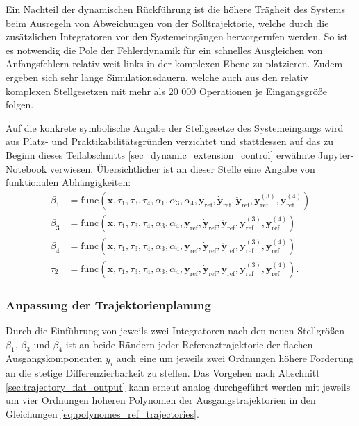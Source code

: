 Ein Nachteil der dynamischen Rückführung ist die höhere Trägheit des Systems beim Ausregeln von Abweichungen von der Solltrajektorie, welche durch die zusätzlichen Integratoren vor den Systemeingängen hervorgerufen werden. So ist es notwendig die Pole der Fehlerdynamik für ein schnelles Ausgleichen von Anfangsfehlern relativ weit links in der komplexen Ebene zu platzieren. Zudem ergeben sich sehr lange Simulationsdauern, welche auch aus den relativ komplexen Stellgesetzen mit mehr als 20 000 Operationen je Eingangsgröße folgen. 

Auf die konkrete symbolische Angabe der Stellgesetze des Systemeingangs wird aus Platz- und Praktikabilitätsgründen verzichtet und stattdessen auf das zu Beginn dieses Teilabschnitts \ref{sec_dynamic_extension_control} erwähnte Jupyter-Notebook verwiesen. Übersichtlicher ist an dieser Stelle eine Angabe von funktionalen Abhängigkeiten:
\begin{subequations}
	\begin{align}
		\beta_1 &= \mathrm{func}(\mathbf{x}, \tau_1, \tau_3, \tau_4, \alpha_1, \alpha_3, \alpha_4, \mathbf{y}_{\mathrm{ref}}, \dot{\mathbf{y}}_{\mathrm{ref}}, \ddot{\mathbf{y}}_{\mathrm{ref}}, \mathbf{y}_{\mathrm{ref}}^{(3)}, \mathbf{y}_{\mathrm{ref}}^{(4)}) \\
		\beta_3 &= \mathrm{func}(\mathbf{x}, \tau_1, \tau_3, \tau_4, \alpha_3, \alpha_4, \mathbf{y}_{\mathrm{ref}}, \dot{\mathbf{y}}_{\mathrm{ref}}, \ddot{\mathbf{y}}_{\mathrm{ref}}, \mathbf{y}_{\mathrm{ref}}^{(3)}, \mathbf{y}_{\mathrm{ref}}^{(4)}) \\
		\beta_4 &= \mathrm{func}(\mathbf{x}, \tau_1, \tau_3, \tau_4, \alpha_3, \alpha_4, \mathbf{y}_{\mathrm{ref}}, \dot{\mathbf{y}}_{\mathrm{ref}}, \ddot{\mathbf{y}}_{\mathrm{ref}}, \mathbf{y}_{\mathrm{ref}}^{(3)}, \mathbf{y}_{\mathrm{ref}}^{(4)}) \\
		\tau_2 &= \mathrm{func}(\mathbf{x}, \tau_1, \tau_3, \tau_4, \alpha_3, \alpha_4, \mathbf{y}_{\mathrm{ref}}, \dot{\mathbf{y}}_{\mathrm{ref}}, \ddot{\mathbf{y}}_{\mathrm{ref}}, \mathbf{y}_{\mathrm{ref}}^{(3)}, \mathbf{y}_{\mathrm{ref}}^{(4)}).
	\end{align}
\end{subequations}

\subsubsection{Anpassung der Trajektorienplanung}
Durch die Einführung von jeweils zwei Integratoren nach den neuen Stellgrößen $\beta_1$, $\beta_3$ und $\beta_4$ ist an beide Rändern jeder Referenztrajektorie der flachen Ausgangskomponenten $y_i$ auch eine um  jeweils zwei Ordnungen höhere Forderung an die stetige Differenzierbarkeit zu stellen. Das Vorgehen nach Abschnitt \ref{sec:trajectory_flat_output} kann erneut analog durchgeführt werden mit jeweils um vier Ordnungen höheren Polynomen der Ausgangstrajektorien in den Gleichungen \eqref{eq:polynomes_ref_trajectories}.


